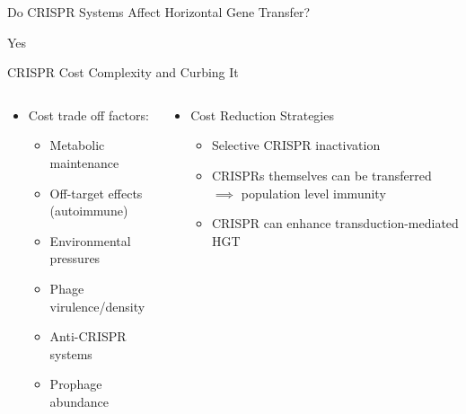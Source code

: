 \documentclass[dvipsnames]{beamer}
\begin{document}
\begin{frame}{}%
    \begin{center}
        \Huge \textcolor{OliveGreen}{Do CRISPR Systems Affect Horizontal Gene Transfer?}
    \end{center}
    \addtocounter{framenumber}{-1}
\end{frame}
\begin{frame}[fragile]{}%
    \begin{center}
        \Huge Yes
    \end{center}
\end{frame}
\begin{frame}[fragile]{CRISPR Cost Complexity and Curbing It}
    \begin{columns}
    \begin{column}{0.5\textwidth} %
        \begin{itemize}
        \item<2-> Cost trade off factors:
        \begin{itemize}
            \item<3-> Metabolic maintenance \autocite{crispgen}
            \item<4-> Off-target effects (autoimmune) \autocite{selfcrisp}
            \item<5-> Environmental pressures \autocite{hospital}
            \item<7-> Phage virulence/density \autocite{acqorres}
            \item<8-> Anti-CRISPR systems \autocite{acqorres}
            \item<10-> Prophage abundance \autocite{transhgt}
        \end{itemize}
        \end{itemize}
    \end{column}
    \begin{column}{0.5\textwidth} %
    \begin{itemize}
        \item<2-> Cost Reduction Strategies
        \begin{itemize}
            \item<6-> Selective CRISPR inactivation \autocite{crispgen}
            \item<9-> CRISPRs themselves can be transferred $\implies$ population level immunity \autocite{crisprlgt}
            \item<11-> CRISPR can enhance transduction-mediated HGT \autocite{transhgt}
        \end{itemize}
    \end{itemize}
    \end{column}
\end{columns}
\end{frame}
\end{document}
